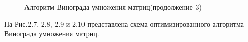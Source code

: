 \documentclass[a4paper,12pt]{report}
\begin{document}
\begin{figure}[ht!]
\caption{Алгоритм Винограда умножения матриц(продолжение 3)}
\end{figure}
\newpage

На Рис.2.7, 2.8, 2.9 и 2.10 представлена схема оптимизированного алгоритма Винограда умножения матриц.
\end{document}
